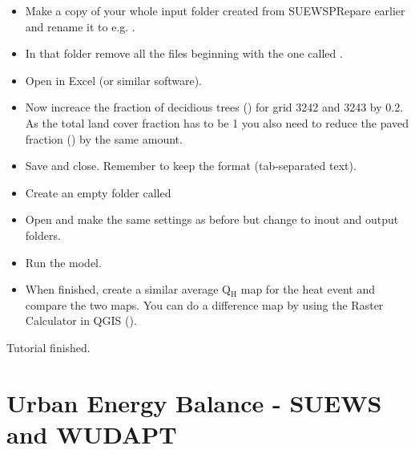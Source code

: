 \documentclass[letterpaper,10pt,english]{sphinxmanual}
\begin{document}
\begin{itemize}
\item {} 
Make a copy of your whole input folder created from SUEWSPRepare earlier and rename it to e.g. .

\item {} 
In that folder remove all the files beginning with   the one called .

\item {} 
Open  in Excel (or similar software).

\item {} 
Now increace the fraction of decidious trees () for grid 3242 and 3243 by 0.2. As the total land cover fraction has to be 1 you also need to reduce the paved fraction () by the same amount.

\item {} 
Save and close. Remember to keep the format (tab-separated text).

\item {} 
Create an empty folder called 

\item {} 
Open {\hyperref[\detokenize{Tutorials/SuewsAdvanced::doc}]{}} and make the same settings as before but change to inout and output folders.

\item {} 
Run the model.

\item {} 
When finished, create a similar average Q$_{\text{H}}$ map for the heat event and compare the two maps. You can do a difference map by using the Raster Calculator in QGIS ().

\end{itemize}

Tutorial finished.


\section{Urban Energy Balance - SUEWS and WUDAPT}
\label{\detokenize{Tutorials/SuewsWUDAPT:urban-energy-balance-suews-and-wudapt}}\label{\detokenize{Tutorials/SuewsWUDAPT:suewswudapt}}\label{\detokenize{Tutorials/SuewsWUDAPT::doc}}
\end{document}
